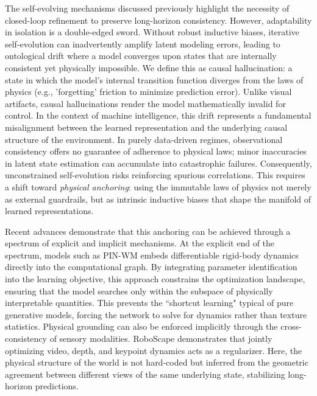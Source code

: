 \documentclass[pdflatex,sn-mathphys-num]{sn-jnl}
\theoremstyle{thmstyleone}%
\theoremstyle{thmstyletwo}%
\theoremstyle{thmstylethree}%
\begin{document}
The self-evolving mechanisms discussed previously highlight the necessity of closed-loop refinement to preserve long-horizon consistency. However, adaptability in isolation is a double-edged sword. Without robust inductive biases, iterative self-evolution can inadvertently amplify latent modeling errors, leading to ontological drift where a model converges upon states that are internally consistent yet physically impossible. We define this as causal hallucination: a state in which the model’s internal transition function diverges from the laws of physics (e.g., 'forgetting' friction to minimize prediction error). Unlike visual artifacts, causal hallucinations render the model mathematically invalid for control.
In the context of machine intelligence, this drift represents a fundamental misalignment between the learned representation and the underlying causal structure of the environment. In purely data-driven regimes, observational consistency offers no guarantee of adherence to physical laws; minor inaccuracies in latent state estimation can accumulate into catastrophic failures. Consequently, unconstrained self-evolution risks reinforcing spurious correlations. This requires a shift toward \emph{physical anchoring}: using the immutable laws of physics not merely as external guardrails, but as intrinsic inductive biases that shape the manifold of learned representations. 


Recent advances demonstrate that this anchoring can be achieved through a spectrum of explicit and implicit mechanisms. At the explicit end of the spectrum, models such as PIN-WM \citep{li2025pin} embeds differentiable rigid-body dynamics directly into the computational graph. By integrating parameter identification into the learning objective, this approach constrains the optimization landscape, ensuring that the model searches only within the subspace of physically interpretable quantities. This prevents the ``shortcut learning" typical of pure generative models, forcing the network to solve for dynamics rather than texture statistics. Physical grounding can also be enforced implicitly through the cross-consistency of sensory modalities. RoboScape \citep{shang2025roboscape} demonstrates that jointly optimizing video, depth, and keypoint dynamics acts as a regularizer. Here, the physical structure of the world is not hard-coded but inferred from the geometric agreement between different views of the same underlying state, stabilizing long-horizon predictions.
\end{document}
